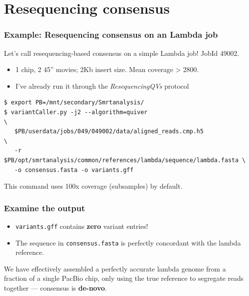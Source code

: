 \documentclass[11pt,serif]{beamer}
\begin{document}
\section{Resequencing consensus}
\label{sec-2}
\begin{frame}[fragile]\frametitle{Example: Resequencing consensus on an Lambda job}
\label{sec-2-1}

   Let's call resequencing-based consensus on a simple Lambda job!
   JobId 49002.
\begin{itemize}
\item 1 chip, 2 45'' movies; 2Kb insert size.  Mean coverage > 2800.
\item I've already run it through the \emph{ResequencingQVs} protocol
\end{itemize}

\begin{scriptsize}
\begin{verbatim}
$ export PB=/mnt/secondary/Smrtanalysis/
$ variantCaller.py -j2 --algorithm=quiver                                 \
   $PB/userdata/jobs/049/049002/data/aligned_reads.cmp.h5                 \
   -r $PB/opt/smrtanalysis/common/references/lambda/sequence/lambda.fasta \
   -o consensus.fasta -o variants.gff
\end{verbatim}
\end{scriptsize}

This command uses 100x coverage (subsamples) by default.
\end{frame}
\begin{frame}[fragile]\frametitle{Examine the output}
\label{sec-2-2}

\begin{itemize}
\item \verb~variants.gff~ contains \textbf{zero} variant entries!
\item The sequence in \verb~consensus.fasta~ is perfectly concordant with the
    lambda reference.
\end{itemize}

  We have effectively assembled a perfectly accurate lambda genome
  from a fraction of a single PacBio chip, only using the true
  reference to segregate reads together --- consensus is \textbf{de-novo}.
\end{frame}
\end{document}
